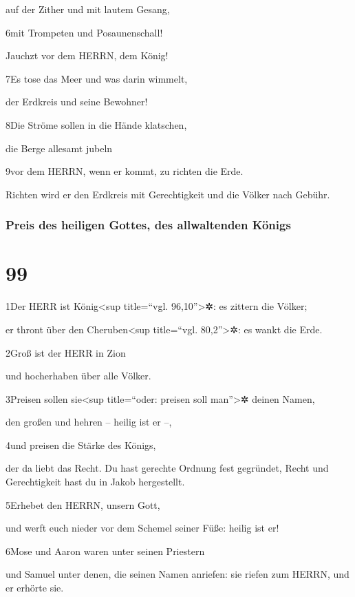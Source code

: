 auf der Zither und mit lautem Gesang,

6mit Trompeten und Posaunenschall!

Jauchzt vor dem HERRN, dem König!

7Es tose das Meer und was darin wimmelt,

der Erdkreis und seine Bewohner!

8Die Ströme sollen in die Hände klatschen,

die Berge allesamt jubeln

9vor dem HERRN, wenn er kommt, zu richten die Erde.

Richten wird er den Erdkreis mit Gerechtigkeit und die Völker nach
Gebühr.

\hypertarget{preis-des-heiligen-gottes-des-allwaltenden-kuxf6nigs}{%
\subsubsection{Preis des heiligen Gottes, des allwaltenden
Königs}\label{preis-des-heiligen-gottes-des-allwaltenden-kuxf6nigs}}

\hypertarget{section-98}{%
\section{99}\label{section-98}}

1Der HERR ist König\textless sup title=``vgl. 96,10''\textgreater✲: es
zittern die Völker;

er thront über den Cheruben\textless sup title=``vgl.
80,2''\textgreater✲: es wankt die Erde.

2Groß ist der HERR in Zion

und hocherhaben über alle Völker.

3Preisen sollen sie\textless sup title=``oder: preisen soll
man''\textgreater✲ deinen Namen,

den großen und hehren -- heilig ist er --,

4und preisen die Stärke des Königs,

der da liebt das Recht. Du hast gerechte Ordnung fest gegründet, Recht
und Gerechtigkeit hast du in Jakob hergestellt.

5Erhebet den HERRN, unsern Gott,

und werft euch nieder vor dem Schemel seiner Füße: heilig ist er!

6Mose und Aaron waren unter seinen Priestern

und Samuel unter denen, die seinen Namen anriefen: sie riefen zum HERRN,
und er erhörte sie.

